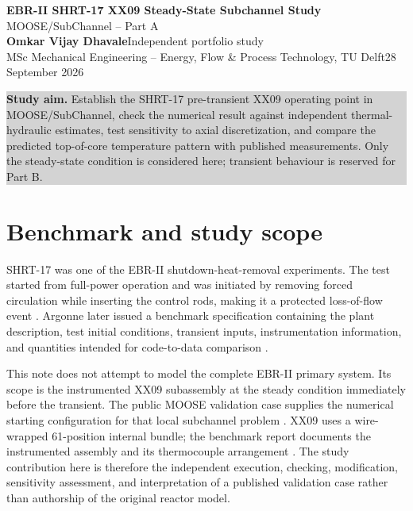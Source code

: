\documentclass[10pt,a4paper]{article}
\begin{document}
{\LARGE\bfseries\color{accent} EBR-II SHRT-17 XX09 Steady-State Subchannel Study}\\[-1mm]
{\large MOOSE/SubChannel -- Part A}\\[2mm]
{\bfseries Omkar Vijay Dhavale}\hfill Independent portfolio study\\
MSc Mechanical Engineering -- Energy, Flow \& Process Technology, TU Delft\hfill 28 September 2026

\vspace{2mm}
\colorbox{lightgray}{\parbox{0.975\linewidth}{\small
\textbf{Study aim.} Establish the SHRT-17 pre-transient XX09 operating point in MOOSE/SubChannel, check the numerical result against independent thermal-hydraulic estimates, test sensitivity to axial discretization, and compare the predicted top-of-core temperature pattern with published measurements. Only the steady-state condition is considered here; transient behaviour is reserved for Part B.}}

\section{Benchmark and study scope}

SHRT-17 was one of the EBR-II shutdown-heat-removal experiments. The test started from full-power operation and was initiated by removing forced circulation while inserting the control rods, making it a protected loss-of-flow event \parencite{sumner2012}. Argonne later issued a benchmark specification containing the plant description, test initial conditions, transient inputs, instrumentation information, and quantities intended for code-to-data comparison \parencite{sumner2012}.

This note does not attempt to model the complete EBR-II primary system. Its scope is the instrumented XX09 subassembly at the steady condition immediately before the transient. The public MOOSE validation case supplies the numerical starting configuration for that local subchannel problem \parencite{moose_ebrii}. XX09 uses a wire-wrapped 61-position internal bundle; the benchmark report documents the instrumented assembly and its thermocouple arrangement \parencite{sumner2012}. The study contribution here is therefore the independent execution, checking, modification, sensitivity assessment, and interpretation of a published validation case rather than authorship of the original reactor model.
\end{document}
